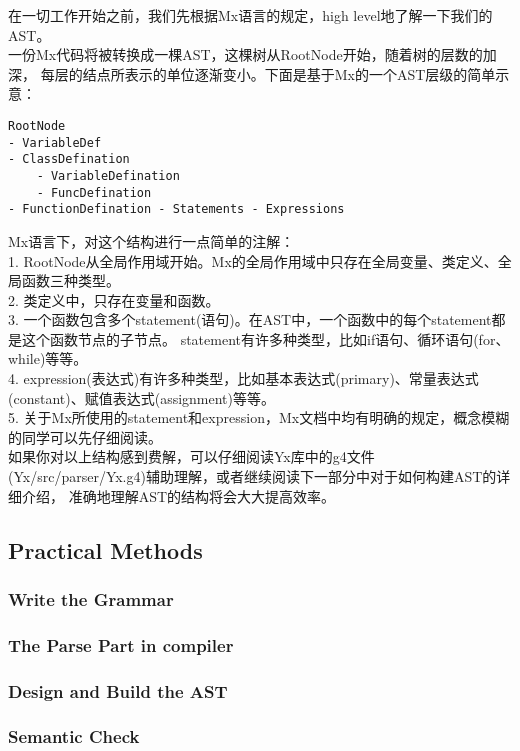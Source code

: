 \documentclass{article}
\begin{document}
在一切工作开始之前，我们先根据Mx语言的规定，high level地了解一下我们的AST。 \\

一份Mx代码将被转换成一棵AST，这棵树从RootNode开始，随着树的层数的加深，
每层的结点所表示的单位逐渐变小。下面是基于Mx的一个AST层级的简单示意：
\begin{verbatim}
RootNode 
- VariableDef
- ClassDefination
    - VariableDefination
    - FuncDefination
- FunctionDefination - Statements - Expressions 
\end{verbatim}

Mx语言下，对这个结构进行一点简单的注解：\\
1. RootNode从全局作用域开始。Mx的全局作用域中只存在全局变量、类定义、全局函数三种类型。\\
2. 类定义中，只存在变量和函数。 \\
3. 一个函数包含多个statement(语句)。在AST中，一个函数中的每个statement都是这个函数节点的子节点。
statement有许多种类型，比如if语句、循环语句(for、while)等等。\\
4. expression(表达式)有许多种类型，比如基本表达式(primary)、常量表达式(constant)、赋值表达式(assignment)等等。 \\
5. 关于Mx所使用的statement和expression，Mx文档中均有明确的规定，概念模糊的同学可以先仔细阅读。 \\

如果你对以上结构感到费解，可以仔细阅读Yx库中的g4文件(Yx/src/parser/Yx.g4)辅助理解，或者继续阅读下一部分中对于如何构建AST的详细介绍，
准确地理解AST的结构将会大大提高效率。\\

\subsection{Practical Methods}

\subsubsection{Write the Grammar}

\subsubsection{The Parse Part in compiler}

\subsubsection{Design and Build the AST}

\subsubsection{Semantic Check}
\end{document}
